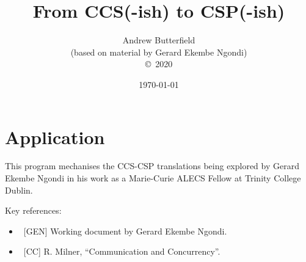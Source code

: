 \documentclass[fleqn,10pt]{report}
\author{
Andrew Butterfield
\\(based on material by Gerard Ekembe Ngondi)
\\
{\small \copyright\ 2020}
}
\title{
  From CCS(-ish) to CSP(-ish)
}
\date{
\today
}
\begin{document}
\maketitle
\tableofcontents


\chapter{Application}

This program mechanises the CCS-CSP translations
being explored by Gerard Ekembe Ngondi
in his work as a Marie-Curie ALECS Fellow at Trinity College Dublin.

Key references:
\begin{itemize}
  \item ~[GEN] Working document by Gerard Ekembe Ngondi.
  \item ~[CC] R. Milner, ``Communication and Concurrency''.
\end{itemize}

% 
%
%
% 

% 
%
%
%
%
% 

% 



\end{document}
